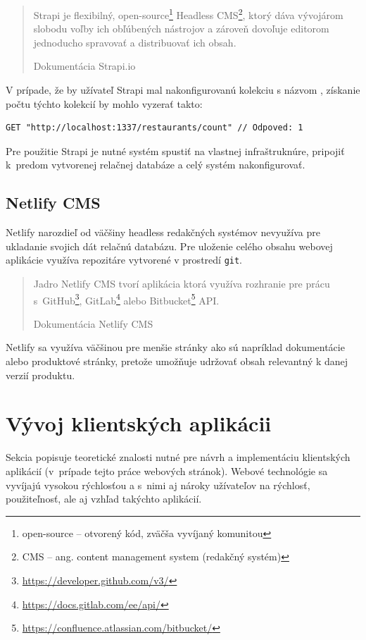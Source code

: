 \blockquote[Dokumentácia Strapi.io \cite{StrapiDocs}]{Strapi je flexibilný, open-source\footnote{open-source -- otvorený kód, zväčša vyvíjaný komunitou} Headless CMS\footnote{CMS -- ang. content management system (redakčný systém)}, ktorý dáva vývojárom slobodu voľby ich obľúbených nástrojov a zároveň dovoľuje editorom jednoducho spravovať a distribuovať ich obsah.}

\noindent V prípade, že by užívateľ Strapi mal nakonfigurovanú kolekciu s názvom , získanie počtu týchto kolekcií by mohlo vyzerať takto: \\

\lstset{style=CommonCodeStyle, language=TypeScript}

\begin{lstlisting}[caption=Príklad HTTP požiadavku na REST rozhranie Strapi.]
	GET "http://localhost:1337/restaurants/count" // Odpoved: 1
\end{lstlisting}

\bigskip

\noindent Pre použitie Strapi je nutné systém spustiť na vlastnej infraštruknúre, pripojiť k~predom vytvorenej relačnej databáze a celý systém nakonfigurovať.

\subsection{Netlify CMS}
Netlify narozdieľ od väčšiny headless redakčných systémov nevyužíva pre ukladanie svojich dát relačnú databázu. Pre uloženie celého obsahu webovej aplikácie využíva repozitáre vytvorené v prostredí \texttt{git}.

\blockquote[Dokumentácia Netlify CMS \cite{NetlifyDocs}]{Jadro Netlify CMS tvorí  aplikácia ktorá využíva rozhranie pre prácu s~GitHub\footnote{\href{https://developer.github.com/v3/}{https://developer.github.com/v3/}}, GitLab\footnote{\href{https://docs.gitlab.com/ee/api/}{https://docs.gitlab.com/ee/api/}} alebo Bitbucket\footnote{\href{https://confluence.atlassian.com/bitbucket/}{https://confluence.atlassian.com/bitbucket/}} API.}

\noindent Netlify sa využíva väčšinou pre menšie stránky ako sú napríklad dokumentácie alebo produktové stránky, pretože umožňuje udržovať obsah relevantný k danej verzií produktu.

\section{Vývoj klientských aplikácii}
\label{section:client_dev}
Sekcia popisuje teoretické znalosti nutné pre návrh a implementáciu klientských aplikácií (v~prípade tejto práce webových stránok). Webové technológie sa vyvíjajú vysokou rýchlosťou a s~nimi aj nároky užívateľov na rýchlosť, použiteľnosť, ale aj vzhľad takýchto aplikácií.


